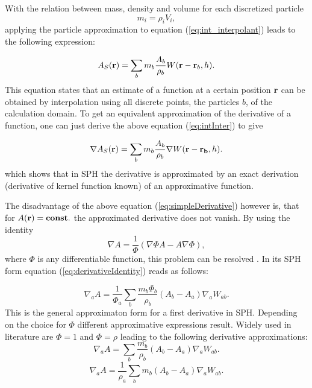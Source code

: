 \documentclass{report}
\begin{document}
With the relation between mass, density and volume for each discretized particle
\begin{equation}
m_i=\rho_i V_i,
\end{equation}
applying the particle approximation to equation (\ref{eq:int_interpolant}) leads to the following expression:

\begin{equation}
\label{eq:intInter}
A_S({\bf r})=\sum_b m_b \frac{A_b}{\rho_b}W({\bf r}-{\bf r}_b,h).
\end{equation}
This equation states that an estimate of a function at a certain position ${\bf r}$ can be obtained by interpolation using all discrete points, the particles $b$, of the calculation domain. 
To get an equivalent approximation of the derivative of a function, one can just derive the above equation (\ref{eq:intInter}) to give~\cite{Monaghan2005, Liu2003} 

\begin{equation}
\label{eq:simpleDerivative}
\nabla A_S({\bf r})=\sum_b m_b \frac{A_b}{\rho_b}\nabla W({\bf r}-{\bf r_b},h).
\end{equation}
which shows that in SPH the derivative is approximated by an exact derivation (derivative of kernel function known) of an approximative function.

The disadvantage of the above equation (\ref{eq:simpleDerivative}) however is, that for
$A(\bf{r})=const.$ the approximated derivative does not vanish. By using the identity
\begin{equation}
\label{eq:derivativeIdentity}
\nabla A = \frac{1}{\Phi}(\nabla {\Phi A}-A\nabla \Phi),
\end{equation}
where $\Phi$ is any differentiable function, this problem can be resolved \cite{Monaghan2005}. In its
SPH form equation (\ref{eq:derivativeIdentity}) reads as follows:

\begin{equation}
\label{eq:genFirstDerivativeSPH_Approximation}
\nabla_a A = \frac{1}{\Phi_a}\sum_b \frac{m_b \Phi_b}{\rho_b}(A_b-A_a)\nabla_a W_{ab}.
\end{equation}
This is the general approximaton form for a first derivative in SPH. Depending on the choice for $\Phi$ different approximative expressions result. Widely used in literature are $\Phi=1$ and $\Phi=\rho$ leading to the following derivative approximations:
\begin{equation}
\label{eq:genFirstDerivativeSPH_Approximation_Phi_1}
\nabla_a A = \sum_b \frac{m_b}{\rho_b}(A_b-A_a)\nabla_a W_{ab}.
\end{equation}
\begin{equation}
\label{eq:genFirstDerivativeSPH_Approximation_Phi_rho}
\nabla_a A = \frac{1}{\rho_a}\sum_b m_b (A_b-A_a)\nabla_a W_{ab}.
\end{equation}
\end{document}
